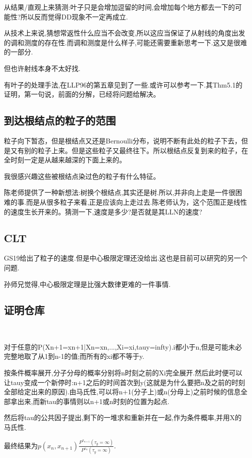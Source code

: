 \documentclass[a4paper,oneside]{ctexbook}
\begin{document}
						从结果/直观上来猜测:叶子只是会增加逗留的时间,会增加每个地方都去一下的可能性?所以反而觉得DD现象不一定再成立.

						从技术上来说,猜想常返性什么应当不会改变,所以这应当保证了从射线的角度出发的调和测度的存在性.而调和测度是什么样子,可能还需要重新思考一下.这又是很难的一部分.

						但也许射线本身不太好找.

						有叶子的处理手法,在LLP96的第五章见到了一些.或许可以参考一下.其Thm5.1的证明，第一句说，前面的分解，已经将问题给解决。


	\subsection{到达根结点的粒子的范围}
		
		粒子向下暂态，但是根结点又还是Bernoulli分布，说明不断有此处的粒子下去，但是又有别的粒子上来。但是这些粒子又最终往下。所以根结点反复到来的粒子，在全时刻一定是从越来越深的下面上来的。

		我很感兴趣这些被根结点染过色的粒子有什么特征。

		陈老师提供了一种新想法:树换个根结点,其实还是树.所以,并非向上走是一件很困难的事.而是从很多粒子来看,正是应该向上走过去.陈老师认为，这个范围正是线性的速度生长开来的。猜测一下,速度是多少?是否就是其LLN的速度?

	\subsection{CLT}

		GS19\cite{GS19}给出了粒子的速度.但是中心极限定理还没给出.这也是目前可以研究的另一个问题.

		孙师兄觉得,中心极限定理是比强大数律更难的一件事情.

	\subsection{证明仓库}

		\begin{pf}[木师姐的证明]
			\label{mu}
			\ 

			对于任意的P(Xn+1=xn+1|Xn=xn,...,Xi=xi,tauy=infty).i都小于n,但是可能未必完整地取了从1到n-1的值;而所有的xi都不等于y.

			按条件概率展开,分子分母的概率分别将n时刻之前的Xi完全展开.然后此时便可以让tauy变成一个新停时:n+1之后的时间首次到y(这就是为什么要把n及之前的时刻全部给定出来的原因).由马氏性,可以将n+1(分子上)或n(分母上)之前时候的信息全部拿出来,而新tau的事情则以n+1或n时刻的位置为起点.

			然后将tau的公共因子提出,剩下的一堆求和重新并在一起,作为条件概率,并用X的马氏性.

			最终结果为$p(x_n,x_{n+1})\displaystyle\frac
			{P^{x_{n+1}}(\tau_y=\infty)}
			{P^{x_{n}}(\tau_y=\infty)}$.

		\end{pf}
\end{document}
